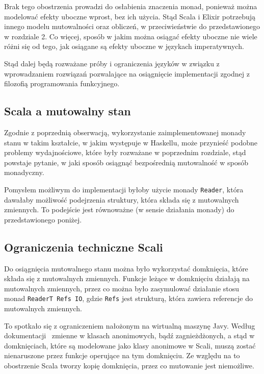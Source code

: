 \documentclass[../praca.tex]{subfiles}
\begin{document}
Brak tego obostrzenia prowadzi do osłabienia znaczenia monad, ponieważ
można modelować efekty uboczne wprost, bez ich użycia. Stąd Scala i Elixir
potrzebują innego modelu mutowalności oraz obliczeń, w przeciwieństwie
do przedstawionego w rozdziale 2. Co więcej, sposób
w jakim można osiągać efekty uboczne nie wiele różni się
od tego, jak osiągane są efekty uboczne w językach imperatywnych.

Stąd dalej będą rozważane próby i ograniczenia języków w związku 
z wprowadzaniem rozwiązań pozwalające na osiągnięcie implementacji
zgodnej z filozofią programowania funkcyjnego.

\subsection{Scala a mutowalny stan}

Zgodnie z poprzednią obserwacją, wykorzystanie zaimplementowanej 
monady stanu w takim kształcie,
w jakim występuje w Haskellu, może przynieść podobne problemy wydajnościowe,
które były rozważane w poprzednim rozdziale, stąd powstaje pytanie, w jaki sposób
osiągnąć bezpośrednią mutowalność w sposób monadyczny.

Pomysłem możliwym do implementacji byłoby użycie monady \texttt{Reader}, która
dawałaby możliwość podejrzenia struktury, która składa się z mutowalnych zmiennych.
To podejście jest równoważne (w sensie działania monady) do przedstawionego poniżej.

\subsection{Ograniczenia techniczne Scali}

Do osiągnięcia mutowalnego stanu można było wykorzystać domknięcia, 
które składa się z mutowalnych
zmiennych. Funkcje leżące w domknięciu działają na mutowalnych zmiennych,
przez co można było zasymulować działanie stosu monad \texttt{ReaderT Refs IO},
gdzie \texttt{Refs} jest strukturą, która zawiera referencje do mutowalnych zmiennych.

To spotkało się z ograniczeniem nałożonym na wirtualną maszynę Javy. Według 
dokumentacji~\cite{Oracle:IC} zmienne w klasach anonimowych, bądź zagnieżdżonych, 
a stąd w domknięciach, które są modelowane jako klasy anonimowe w Scali, muszą zostać
nienaruszone przez funkcje operujące na tym domknięciu. 
Ze względu na to obostrzenie Scala tworzy kopię domknięcia, 
przez co mutowanie jest niemożliwe. 
\end{document}
